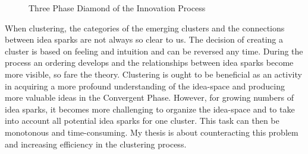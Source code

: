 \documentclass[pdftex,a4paper,12pt]{scrartcl}
\theoremstyle{definition}
\begin{document}
\begin{figure}[h]
    \centering
    \caption{Three Phase Diamond of the Innovation Process \citep{tassoul_clustering_2007}}
    \label{fig:diamond}
\end{figure}

When clustering, the categories of the emerging clusters and the connections between idea sparks are not always so clear to us. The decision of creating a cluster is based on feeling and intuition and can be reversed any time. During the process an ordering develops and the relationships between idea sparks become more visible, so fare the theory.
Clustering is ought to be beneficial as an activity in acquiring a more profound understanding of the idea-space \citep{siangliulue_ideahound_2016} and producing more valuable ideas in the Convergent Phase. However, for growing numbers of idea sparks, it becomes more challenging to organize the idea-space and to take into account all potential idea sparks for one cluster. This task can then be monotonous and time-consuming. My thesis is about counteracting this problem and increasing efficiency in the clustering process.%
   
    
\end{document}
